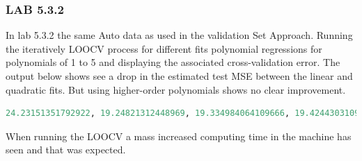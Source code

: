 \subsubsection{LAB 5.3.2}
In lab 5.3.2 the same Auto data as used in the validation Set Approach. Running the iteratively LOOCV process for different fits polynomial regressions for polynomials of 1 to 5 and displaying the associated cross-validation error. The output below shows see a drop in the estimated test MSE between the linear and quadratic fits. But using higher-order polynomials shows no clear improvement.
\begin{lstlisting}[language=Python]
24.23151351792922, 19.24821312448969, 19.334984064109666, 19.42443031091358, 19.0332089609506
\end{lstlisting}
When running the LOOCV a mass increased computing time in the machine has seen and that was expected.